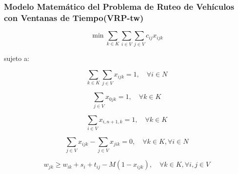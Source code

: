 \documentclass[12pt,titlepage,twoside,openright]{book}
\begin{document}
\subsubsection*{Modelo Matemático del Problema de Ruteo de Vehículos con Ventanas de Tiempo(VRP-tw)}

\begin{equation}
	\min \sum_{k \in K} \sum_{i \in V} \sum_{j \in V} c_{ij} x_{ijk}
	\label{eq:VRPTW_obj}
\end{equation}

sujeto a:

\begin{equation}
	\sum_{k \in K} \sum_{j \in V} x_{ijk} = 1, \quad \forall i \in N
	\label{eq:VRPTW_visit_once}
\end{equation}

\begin{equation}
	\sum_{j \in V} x_{0jk} = 1, \quad \forall k \in K
	\label{eq:VRPTW_start_depot}
\end{equation}

\begin{equation}
	\sum_{i \in V} x_{i,n+1,k} = 1, \quad \forall k \in K
	\label{eq:VRPTW_end_depot}
\end{equation}

\begin{equation}
	\sum_{j \in V} x_{ijk} - \sum_{j \in V} x_{jik} = 0, \quad \forall k \in K, \forall i \in N
	\label{eq:VRPTW_flow_balance}
\end{equation}

\begin{equation}
	w_{jk} \geq w_{ik} + s_i + t_{ij} - M (1 - x_{ijk}), \quad \forall k \in K, \forall i,j \in V
	\label{eq:VRPTW_time_window}
\end{equation}
\end{document}
